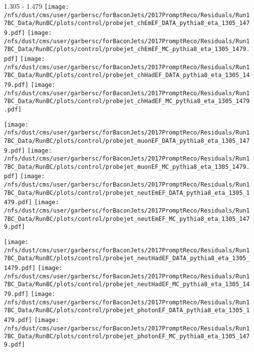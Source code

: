 \documentclass[t,compress]{beamer}
\begin{document}
\begin{frame}{1.305 - 1.479}
	\texttt{[image: /nfs/dust/cms/user/garbersc/forBaconJets/2017PromptReco/Residuals/Run17BC\_Data/RunBC/plots/control/probejet\_chEmEF\_DATA\_pythia8\_eta\_1305\_1479.pdf]}
	\texttt{[image: /nfs/dust/cms/user/garbersc/forBaconJets/2017PromptReco/Residuals/Run17BC\_Data/RunBC/plots/control/probejet\_chEmEF\_MC\_pythia8\_eta\_1305\_1479.pdf]}
	\texttt{[image: /nfs/dust/cms/user/garbersc/forBaconJets/2017PromptReco/Residuals/Run17BC\_Data/RunBC/plots/control/probejet\_chHadEF\_DATA\_pythia8\_eta\_1305\_1479.pdf]}
	\texttt{[image: /nfs/dust/cms/user/garbersc/forBaconJets/2017PromptReco/Residuals/Run17BC\_Data/RunBC/plots/control/probejet\_chHadEF\_MC\_pythia8\_eta\_1305\_1479.pdf]}
\newline

\vspace{-0.65cm}
	\texttt{[image: /nfs/dust/cms/user/garbersc/forBaconJets/2017PromptReco/Residuals/Run17BC\_Data/RunBC/plots/control/probejet\_muonEF\_DATA\_pythia8\_eta\_1305\_1479.pdf]}
	\texttt{[image: /nfs/dust/cms/user/garbersc/forBaconJets/2017PromptReco/Residuals/Run17BC\_Data/RunBC/plots/control/probejet\_muonEF\_MC\_pythia8\_eta\_1305\_1479.pdf]}
	\texttt{[image: /nfs/dust/cms/user/garbersc/forBaconJets/2017PromptReco/Residuals/Run17BC\_Data/RunBC/plots/control/probejet\_neutEmEF\_DATA\_pythia8\_eta\_1305\_1479.pdf]}
	\texttt{[image: /nfs/dust/cms/user/garbersc/forBaconJets/2017PromptReco/Residuals/Run17BC\_Data/RunBC/plots/control/probejet\_neutEmEF\_MC\_pythia8\_eta\_1305\_1479.pdf]}
\newline

\vspace{-0.65cm}
	\texttt{[image: /nfs/dust/cms/user/garbersc/forBaconJets/2017PromptReco/Residuals/Run17BC\_Data/RunBC/plots/control/probejet\_neutHadEF\_DATA\_pythia8\_eta\_1305\_1479.pdf]}
	\texttt{[image: /nfs/dust/cms/user/garbersc/forBaconJets/2017PromptReco/Residuals/Run17BC\_Data/RunBC/plots/control/probejet\_neutHadEF\_MC\_pythia8\_eta\_1305\_1479.pdf]}
	\texttt{[image: /nfs/dust/cms/user/garbersc/forBaconJets/2017PromptReco/Residuals/Run17BC\_Data/RunBC/plots/control/probejet\_photonEF\_DATA\_pythia8\_eta\_1305\_1479.pdf]}
	\texttt{[image: /nfs/dust/cms/user/garbersc/forBaconJets/2017PromptReco/Residuals/Run17BC\_Data/RunBC/plots/control/probejet\_photonEF\_MC\_pythia8\_eta\_1305\_1479.pdf]}
\end{frame}
\end{document}
